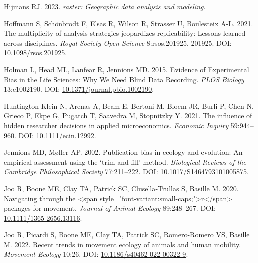 \documentclass[10pt,a4paper]{article}
\newlength{\cslhangindent}
\newlength{\cslentryspacingunit} %
\newenvironment{CSLReferences}[2] %
 {%
  \setlength{\parindent}{0pt}
  \ifodd #1
  \let\oldpar\par
  \def\par{\hangindent=\cslhangindent\oldpar}
  \fi
  \setlength{\parskip}{#2\cslentryspacingunit}
 }%
 {}
\begin{document}
\begin{CSLReferences}{1}{0}
\leavevmode{}%
Hijmans RJ. 2023. \emph{\href{https://CRAN.R-project.org/package=raster}{{raster}: Geographic data analysis and modeling}}.

\leavevmode{}%
Hoffmann S, Schönbrodt F, Elsas R, Wilson R, Strasser U, Boulesteix A-L. 2021. The multiplicity of analysis strategies jeopardizes replicability: Lessons learned across disciplines. \emph{Royal Society Open Science} 8:rsos.201925, 201925. DOI: \href{https://doi.org/10.1098/rsos.201925}{10.1098/rsos.201925}.

\leavevmode{}%
Holman L, Head ML, Lanfear R, Jennions MD. 2015. Evidence of {Experimental} {Bias} in the {Life} {Sciences}: {Why} {We} {Need} {Blind} {Data} {Recording}. \emph{PLOS Biology} 13:e1002190. DOI: \href{https://doi.org/10.1371/journal.pbio.1002190}{10.1371/journal.pbio.1002190}.

\leavevmode{}%
Huntington‐Klein N, Arenas A, Beam E, Bertoni M, Bloem JR, Burli P, Chen N, Grieco P, Ekpe G, Pugatch T, Saavedra M, Stopnitzky Y. 2021. The influence of hidden researcher decisions in applied microeconomics. \emph{Economic Inquiry} 59:944--960. DOI: \href{https://doi.org/10.1111/ecin.12992}{10.1111/ecin.12992}.

\leavevmode{}%
Jennions MD, Møller AP. 2002. Publication bias in ecology and evolution: An empirical assessment using the `trim and fill' method. \emph{Biological Reviews of the Cambridge Philosophical Society} 77:211--222. DOI: \href{https://doi.org/10.1017/S1464793101005875}{10.1017/S1464793101005875}.

\leavevmode{}%
Joo R, Boone ME, Clay TA, Patrick SC, Clusella‐Trullas S, Basille M. 2020. Navigating through the {\textless{}}span style="font-variant:small-caps;"{\textgreater{}}r{\textless{}}/span{\textgreater{}} packages for movement. \emph{Journal of Animal Ecology} 89:248--267. DOI: \href{https://doi.org/10.1111/1365-2656.13116}{10.1111/1365-2656.13116}.

\leavevmode{}%
Joo R, Picardi S, Boone ME, Clay TA, Patrick SC, Romero-Romero VS, Basille M. 2022. Recent trends in movement ecology of animals and human mobility. \emph{Movement Ecology} 10:26. DOI: \href{https://doi.org/10.1186/s40462-022-00322-9}{10.1186/s40462-022-00322-9}.


\end{CSLReferences}
\end{document}
